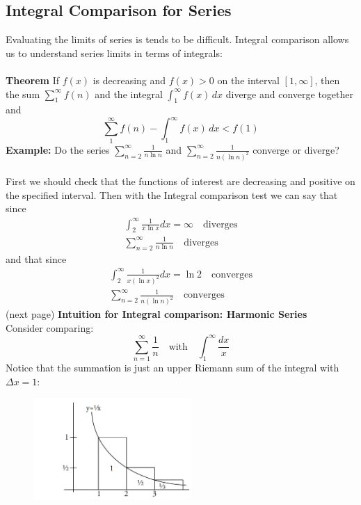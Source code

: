 \documentclass{report}
\begin{document}
\subsection{Integral Comparison for Series} %
Evaluating the limits of series is tends to be difficult. Integral comparison allows us
to understand series limits in terms of integrals:\\
\vspace{1mm}\\
\textbf{Theorem} If $f(x)$ is decreasing and $f(x)>0$ on the interval $[1,\infty]$, then
the sum $\sum^\infty_1f(n)$ and the integral $\int_1^\infty f(x)\,dx$ diverge and converge together and
\begin{equation*}
\sum^\infty_1f(n)-\int_1^\infty f(x)\,dx<f(1)
\end{equation*}
\textbf{Example:} Do the series $\sum^\infty_{n=2}\frac{1}{n\ln n}$ and 
$\sum^\infty_{n=2}\frac{1}{n(\ln n)^2}$ converge or diverge?\\
\vspace{1mm}\\
First we should check that the functions of interest are decreasing and positive on the specified interval. 
Then with the Integral comparison test we can say that since
\begin{align*}
\int_2^\infty\frac{1}{x\ln x}dx=\infty\quad\text{diverges}\\
\sum^\infty_{n=2}\frac{1}{n\ln n}\quad\text{diverges}
\end{align*}
and that since
\begin{align*}
\int_2^\infty\frac{1}{x(\ln x)^2}dx=\ln2\quad\text{converges}\\
\sum^\infty_{n=2}\frac{1}{n(\ln n)^2}\quad\text{converges}
\end{align*}
(next page)
\newpage
\noindent\textbf{Intuition for Integral comparison: Harmonic Series}\\
Consider comparing:
\begin{equation*}
\sum^\infty_{n=1}\frac{1}{n}\quad\text{with}\quad\int_1^\infty\frac{dx}{x}
\end{equation*}
Notice that the summation is just an upper Riemann sum of the integral with $\Delta x=1$:
\begin{figure}[h]
\includegraphics[width=6cm]{Capture61}\\
\centering
{}
\end{figure}\\
\end{document}
